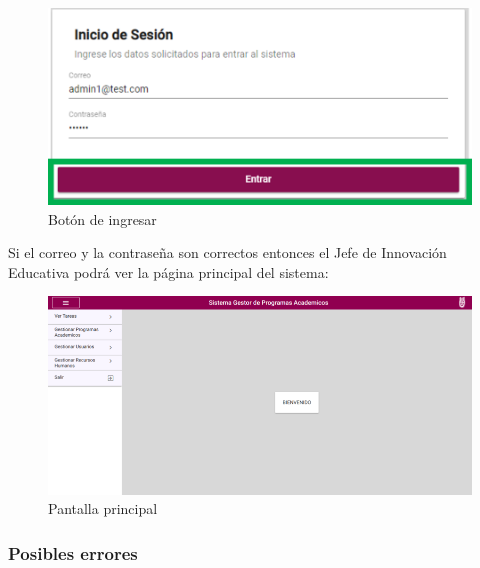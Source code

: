         \begin{figure}[H]
            \centering
            \hypertarget{BotonIng}{\includegraphics[width=0.5\linewidth]{images/SP5/BotonIngresar}}
            \caption{Botón de ingresar}
        \end{figure}

        Si el correo y la contraseña son correctos entonces el Jefe de Innovación Educativa podrá ver la página principal del sistema:

        \begin{figure}[H]
            \centering
            \hypertarget{Principal}{\includegraphics[width=0.7\linewidth]{images/SP5/Principal}}
            \caption{Pantalla principal}
        \end{figure}

        \clearpage
        \subsubsection{Posibles errores}

